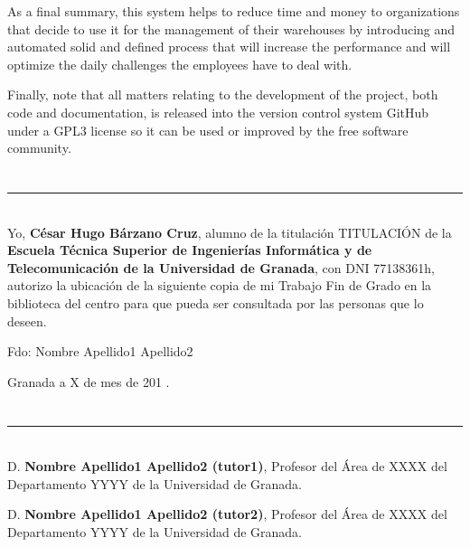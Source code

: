 As a final summary, this system helps to reduce time and money to organizations that decide to use it for the management of their warehouses by introducing and automated solid and defined process that will increase the performance and will optimize the daily challenges the employees have to deal with. 

Finally, note that all matters relating to the development of the project, both code and documentation, is released into the version control system GitHub under a GPL3 license so it can be used or improved by the free software community. 


\chapter*{}
\thispagestyle{empty}

\noindent\rule[-1ex]{\textwidth}{2pt}\\[4.5ex]

Yo, \textbf{César Hugo Bárzano Cruz}, alumno de la titulación TITULACIÓN de la \textbf{Escuela Técnica Superior
de Ingenierías Informática y de Telecomunicación de la Universidad de Granada}, con DNI 77138361h, autorizo la
ubicación de la siguiente copia de mi Trabajo Fin de Grado en la biblioteca del centro para que pueda ser
consultada por las personas que lo deseen.

\vspace{6cm}

\noindent Fdo: Nombre Apellido1 Apellido2

\vspace{2cm}

\begin{flushright}
Granada a X de mes de 201 .
\end{flushright}


\chapter*{}
\thispagestyle{empty}

\noindent\rule[-1ex]{\textwidth}{2pt}\\[4.5ex]

D. \textbf{Nombre Apellido1 Apellido2 (tutor1)}, Profesor del Área de XXXX del Departamento YYYY de la Universidad de Granada.

\vspace{0.5cm}

D. \textbf{Nombre Apellido1 Apellido2 (tutor2)}, Profesor del Área de XXXX del Departamento YYYY de la Universidad de Granada.


